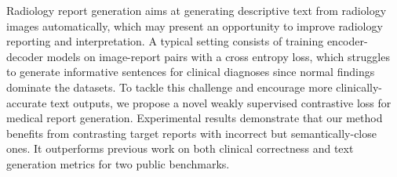 Radiology report generation aims at generating descriptive text from radiology images automatically, which may present an opportunity to improve radiology reporting and interpretation. A typical setting consists of training encoder-decoder models on image-report pairs with a cross entropy loss, which struggles to generate informative sentences for clinical diagnoses since normal findings dominate the datasets. To tackle this challenge and encourage more clinically-accurate text outputs, we propose a novel weakly supervised contrastive loss for medical report generation. Experimental results demonstrate that our method benefits from contrasting target reports with incorrect but semantically-close ones. It outperforms previous work on both clinical correctness and text generation metrics for two public benchmarks.
